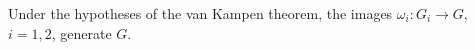 Under the hypotheses of the van Kampen theorem, the images $\omega_i: G_i \to G$, $i = 1, 2$, generate $G$.
